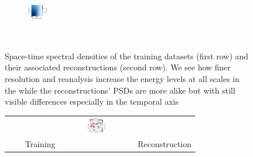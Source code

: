 \begin{bibunit}
\begin{figure}[H]
\begin{minipage}{.80\linewidth}
\begin{subfigure}[t]{.9\linewidth}
\begin{center}
\end{center}

\end{subfigure}
\end{minipage}
\hspace{1.5cm}\begin{minipage}{0.01\linewidth}
\vspace{-.5cm}

\begin{subfigure}[t]{.9\linewidth}
\includegraphics[trim={9.4cm 0 0 0},clip, width=0.88cm,height=2.52cm]{00_Simulearning/figures/plots2/enatl60-0_train_psd_spacetime.png}
\end{subfigure}
\end{minipage}
\caption{
Space-time spectral densities of the training datasets (first row) and their associated reconstructions (second row). We see how finer resolution and reanalysis increase the energy levels at all scales in the while the reconstructions' PSDs are more alike but with still visible differences especially in the temporal axis} \vspace{-5mm}
\label{fig:spacetime_psd}
\end{figure}




\begin{figure}[H]
\small
\begin{center}
\setlength{\tabcolsep}{1pt}
\begin{tabular}{ccccc}
 &&
&\hspace{-30mm} \includegraphics[trim={8mm 7cm 22mm 0},clip,width=3.0cm,height=0.7cm]{00_Simulearning/figures/plots/horizontal_cbar_vort.png} &\\
\hspace{0mm} &&
\hspace{-30mm} Training  
\hspace{3mm}  & 
 & 
\hspace{-30mm} Reconstruction \\



\end{tabular}
\end{center}
\end{figure}
\end{bibunit}
